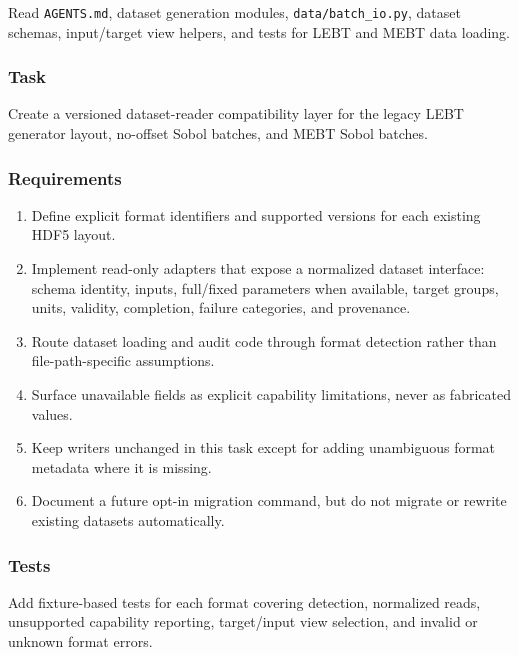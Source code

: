 \documentclass[
]{article}
\providecommand{\tightlist}{%
  \setlength{\itemsep}{0pt}\setlength{\parskip}{0pt}}
\begin{document}
Read \texttt{AGENTS.md}, dataset generation modules,
\texttt{data/batch\_io.py}, dataset schemas, input/target view helpers,
and tests for LEBT and MEBT data loading.

\hypertarget{task-15}{%
\subsubsection{Task}\label{task-15}}

Create a versioned dataset-reader compatibility layer for the legacy
LEBT generator layout, no-offset Sobol batches, and MEBT Sobol batches.

\hypertarget{requirements-15}{%
\subsubsection{Requirements}\label{requirements-15}}

\begin{enumerate}
\def\labelenumi{\arabic{enumi}.}
\tightlist
\item
  Define explicit format identifiers and supported versions for each
  existing HDF5 layout.
\item
  Implement read-only adapters that expose a normalized dataset
  interface: schema identity, inputs, full/fixed parameters when
  available, target groups, units, validity, completion, failure
  categories, and provenance.
\item
  Route dataset loading and audit code through format detection rather
  than file-path-specific assumptions.
\item
  Surface unavailable fields as explicit capability limitations, never
  as fabricated values.
\item
  Keep writers unchanged in this task except for adding unambiguous
  format metadata where it is missing.
\item
  Document a future opt-in migration command, but do not migrate or
  rewrite existing datasets automatically.
\end{enumerate}

\hypertarget{tests-14}{%
\subsubsection{Tests}\label{tests-14}}

Add fixture-based tests for each format covering detection, normalized
reads, unsupported capability reporting, target/input view selection,
and invalid or unknown format errors.
\end{document}
